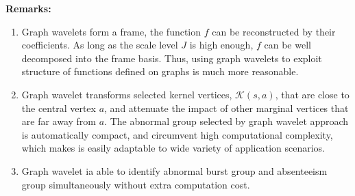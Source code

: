 \documentclass[conference]{IEEEtran}
\begin{document}
{\textbf{Remarks:}}
\begin{enumerate}
\item Graph wavelets form a frame, the function $f$ can be reconstructed by their coefficients.
As long as the scale level $J$ is high enough, $f$ can be well decomposed into the frame basis. Thus, using graph wavelets to exploit structure of functions defined on graphs is much more reasonable.
\item Graph wavelet transforms selected kernel vertices, $\mathcal{K}(s,a)$, that are close to the central vertex $a$, and attenuate the impact of other marginal vertices that are far away from $a$. The abnormal group selected by graph wavelet approach is automatically compact, and circumvent high computational complexity, which makes is easily adaptable to wide variety of application scenarios.
\item Graph wavelet ia able to identify abnormal burst group and absenteeism group simultaneously without extra computation cost.
\end{enumerate}
\end{document}
